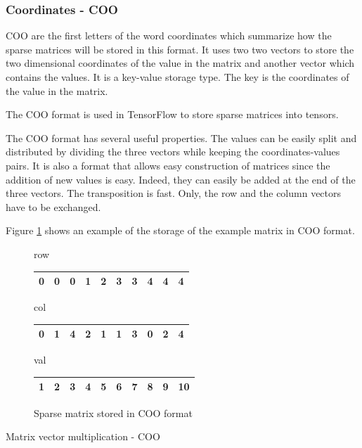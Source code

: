 \subsubsection{Coordinates - COO}
COO are the first letters of the word coordinates which summarize how the sparse matrices will be stored in this format.
It uses two two vectors to store the two dimensional coordinates of the value in the matrix and another vector which contains the values.
It is a key-value storage type.
The key is the coordinates of the value in the matrix.

The COO format is used in TensorFlow to store sparse matrices into tensors.

The COO format has several useful properties.
The values can be easily split and distributed by dividing the three vectors while keeping the coordinates-values pairs.
It is also a format that allows easy construction of matrices since the addition of new values is easy.
Indeed, they can easily be added at the end of the three vectors.
The transposition is fast.
Only, the row and the column vectors have to be exchanged.

Figure \ref{fig:methods:coo_ex} shows an example of the storage of the example matrix in COO format.

\begin{figure}
\centering
row
\bigskip
\begin{tabular}{|cccccccccc|}
\hline
0 & 0 & 0 & 1 & 2 & 3 & 3 & 4 & 4 & 4  \\
\hline
\end{tabular}

col
\bigskip
\begin{tabular}{|cccccccccc|}
\hline
0 & 1 & 4 & 2 & 1 & 1 & 3 & 0 & 2 & 4 \\
\hline
\end{tabular}

val
\bigskip
\begin{tabular}{|cccccccccc|}
\hline
1 & 2 & 3 & 4 & 5 & 6 & 7 & 8 & 9 & 10 \\
\hline
\end{tabular}
\caption{Sparse matrix stored in COO format \label{fig:methods:coo_ex}}
\end{figure}

\begin{algorithm}[h]
	\DontPrintSemicolon
	\caption{Matrix vector multiplication - COO\label{fig:methods:coo_algo}}
\end{algorithm}


